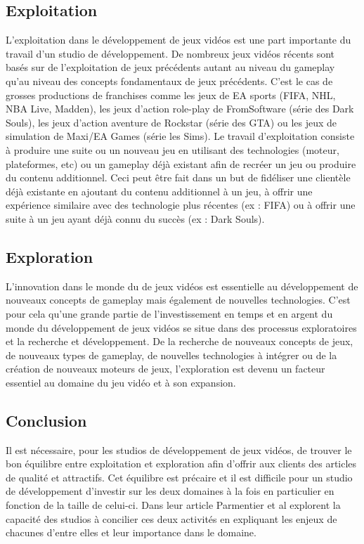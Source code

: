 \subsection{Exploitation}
L'exploitation dans le développement de jeux vidéos est une part importante du travail d'un studio de développement. De nombreux jeux vidéos récents sont basés sur de l'exploitation de jeux précédents autant au niveau du gameplay qu'au niveau des concepts fondamentaux de jeux précédents. C'est le cas de grosses productions de franchises comme les jeux de EA sports (FIFA, NHL, NBA Live, Madden), les jeux d'action role-play de FromSoftware (série des Dark Souls), les jeux d'action aventure de Rockstar (série des GTA) ou les jeux de simulation de Maxi/EA Games (série les Sims). Le travail d'exploitation consiste à produire une suite ou un nouveau jeu en utilisant des technologies (moteur, plateformes, etc) ou un gameplay déjà existant afin de recréer un jeu ou produire du contenu additionnel. Ceci peut être fait dans un but de fidéliser une clientèle déjà existante en ajoutant du contenu additionnel à un jeu, à offrir une expérience similaire avec des technologie plus récentes (ex : FIFA) ou à offrir une suite à un jeu ayant déjà connu du succès (ex : Dark Souls).

\subsection{Exploration}
L'innovation dans le monde du de jeux vidéos est essentielle au développement de nouveaux concepts de gameplay mais également de nouvelles technologies. C'est pour cela qu'une grande partie de l'investissement en temps et en argent du monde du développement de jeux vidéos se situe dans des processus exploratoires et la recherche et développement. De la recherche de nouveaux concepts de jeux, de nouveaux types de gameplay, de nouvelles technologies à intégrer ou de la création de nouveaux moteurs de jeux, l'exploration est devenu un facteur essentiel au domaine du jeu vidéo et à son expansion.


\subsection{Conclusion}
Il est nécessaire, pour les studios de développement de jeux vidéos, de trouver le bon équilibre entre exploitation et exploration afin d'offrir aux clients des articles de qualité et attractifs. Cet équilibre est précaire et il est difficile pour un studio de développement d'investir sur les deux domaines à la fois en particulier en fonction de la taille de celui-ci. Dans leur article Parmentier et al \cite{ParmentierGuy2009Iecd} explorent la capacité des studios à concilier ces deux activités en expliquant les enjeux de chacunes d'entre elles et leur importance dans le domaine.



